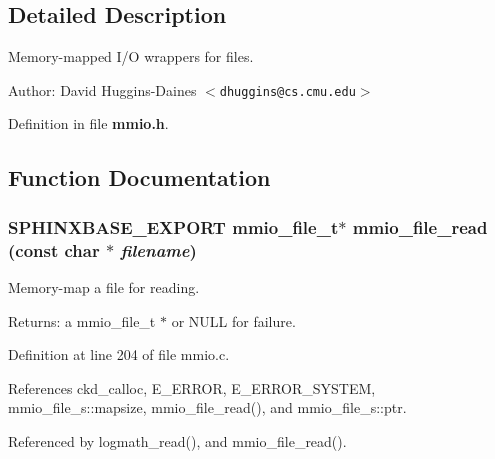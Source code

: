 \subsection{Detailed Description}
Memory-mapped I/O wrappers for files. 

\begin{Desc}
\item[Author:]David Huggins-Daines $<${\tt dhuggins@cs.cmu.edu}$>$ \end{Desc}


Definition in file {\bf mmio.h}.

\subsection{Function Documentation}
\subsubsection[{mmio\_\-file\_\-read}]{\setlength{\rightskip}{0pt plus 5cm}SPHINXBASE\_\-EXPORT {\bf mmio\_\-file\_\-t}$\ast$ mmio\_\-file\_\-read (const char $\ast$ {\em filename})}\label{mmio_8h_e3367a51a50a6108178ecfdd6c983c61}


Memory-map a file for reading. 

\begin{Desc}
\item[Returns:]a mmio\_\-file\_\-t $\ast$ or NULL for failure. \end{Desc}


Definition at line 204 of file mmio.c.

References ckd\_\-calloc, E\_\-ERROR, E\_\-ERROR\_\-SYSTEM, mmio\_\-file\_\-s::mapsize, mmio\_\-file\_\-read(), and mmio\_\-file\_\-s::ptr.

Referenced by logmath\_\-read(), and mmio\_\-file\_\-read().